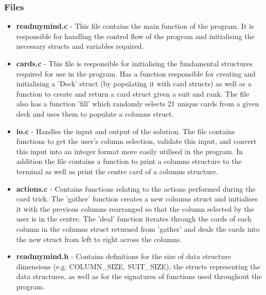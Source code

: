 \documentclass[11]{article}
\begin{document}
			\subsubsection{Files}
				\begin{itemize}
					\item \textbf{readmymind.c} - This file contains the main function of the program. It is responsible for handling the control flow of the program and initialising the necessary structs and variables required.
					\item \textbf{cards.c} - This file is responsible for initialising the fundamental structures required for use in the program. Has a function responsible for creating and initialising a 'Deck' struct (by populating it with card structs) as well as a function to create and return a card struct given a suit and rank. The file also has a function 'fill' which randomly selects 21 unique cards from a given deck and uses them to populate a columns struct.
					\item \textbf{io.c} - Handles the input and output of the solution. The file contains functions to get the user's column selection, validate this input, and convert this input into an integer format more easily utilised in the program. In addition the file contains a function to print a columns structure to the terminal as well as print the centre card of a columns structure.
					\item \textbf{actions.c} - Contains functions relating to the actions performed during the card trick. The 'gather' function creates a new columns struct and initialises it with the previous columns rearranged so that the column selected by the user is in the centre. The 'deal' function iterates through the cards of each column in the columns struct returned from 'gather' and deals the cards into the new struct from left to right across the columns.
					\item \textbf{readmymind.h} - Contains definitions for the size of data structure dimensions (e.g. COLUMN\_SIZE, SUIT\_SIZE), the structs representing the data structures, as well as for the signatures of functions used throughout the program.
				\end{itemize}
			\newpage
\end{document}
